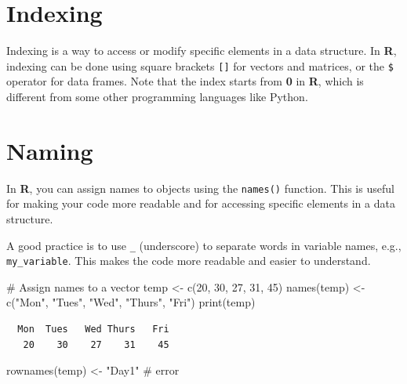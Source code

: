 \documentclass[
  letterpaper,
  DIV=11,
  numbers=noendperiod]{scrreprt}
\newenvironment{Shaded}{\begin{snugshade}}{\end{snugshade}}
\newcommand{\CommentTok}[1]{\textcolor[rgb]{0.37,0.37,0.37}{#1}}
\newcommand{\DecValTok}[1]{\textcolor[rgb]{0.68,0.00,0.00}{#1}}
\newcommand{\FunctionTok}[1]{\textcolor[rgb]{0.28,0.35,0.67}{#1}}
\newcommand{\NormalTok}[1]{\textcolor[rgb]{0.00,0.23,0.31}{#1}}
\newcommand{\OtherTok}[1]{\textcolor[rgb]{0.00,0.23,0.31}{#1}}
\newcommand{\StringTok}[1]{\textcolor[rgb]{0.13,0.47,0.30}{#1}}
\begin{document}
\section{Indexing}\label{indexing}

Indexing is a way to access or modify specific elements in a data
structure. In \textbf{R}, indexing can be done using square brackets
\texttt{{[}{]}} for vectors and matrices, or the \texttt{\$} operator
for data frames. Note that the index starts from \textbf{0} in
\textbf{R}, which is different from some other programming languages
like Python.

\section{Naming}\label{naming}

In \textbf{R}, you can assign names to objects using the
\texttt{names()} function. This is useful for making your code more
readable and for accessing specific elements in a data structure.

A good practice is to use \texttt{\_} (underscore) to separate words in
variable names, e.g., \texttt{my\_variable}. This makes the code more
readable and easier to understand.

\begin{Shaded}
\begin{Highlighting}[]
\CommentTok{\# Assign names to a vector}
\NormalTok{temp }\OtherTok{\textless{}{-}} \FunctionTok{c}\NormalTok{(}\DecValTok{20}\NormalTok{, }\DecValTok{30}\NormalTok{, }\DecValTok{27}\NormalTok{, }\DecValTok{31}\NormalTok{, }\DecValTok{45}\NormalTok{)}
\FunctionTok{names}\NormalTok{(temp) }\OtherTok{\textless{}{-}} \FunctionTok{c}\NormalTok{(}\StringTok{"Mon"}\NormalTok{, }\StringTok{"Tues"}\NormalTok{, }\StringTok{"Wed"}\NormalTok{, }\StringTok{"Thurs"}\NormalTok{, }\StringTok{"Fri"}\NormalTok{)}
\FunctionTok{print}\NormalTok{(temp)}
\end{Highlighting}
\end{Shaded}

\begin{verbatim}
  Mon  Tues   Wed Thurs   Fri 
   20    30    27    31    45 
\end{verbatim}

\begin{Shaded}
\begin{Highlighting}[]
\FunctionTok{rownames}\NormalTok{(temp) }\OtherTok{\textless{}{-}} \StringTok{"Day1"} \CommentTok{\# error}
\end{Highlighting}
\end{Shaded}
\end{document}
